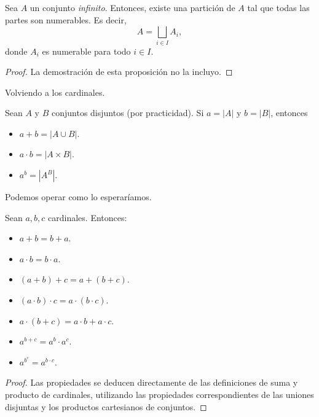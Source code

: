 \begin{proposition}
	Sea $A$ un conjunto \textit{infinito}. Entonces, existe una partición de $A$ tal que todas las partes son numerables. Es decir,
	\begin{equation*}
		A = \bigsqcup_{i \in I} A_i,
	\end{equation*}
	donde $A_i$ es numerable para todo $i \in I$.
\end{proposition}

\begin{proof}
	{\color{red} La demostración de esta proposición no la incluyo.}
\end{proof}

Volviendo a los cardinales.

\begin{definition}
	Sean $A$ y $B$ conjuntos disjuntos (por practicidad). Si $a = \lvert A \rvert$ y $b = \lvert B \rvert$, entonces
	\begin{itemize}
		\item $a + b = |A \cup B|$.
		\item $a \cdot b = |A \times B|$.
		\item $a^{b} = |A^{B}|$.
	\end{itemize}
\end{definition}

Podemos operar como lo esperaríamos.

\begin{proposition}
	Sean $a, b, c$ cardinales. Entonces:
	\begin{itemize}
		\item $a + b = b + a$.
		\item $a \cdot b = b \cdot a$.
		\item $(a + b) + c = a + (b + c)$.
		\item $(a \cdot b) \cdot c = a \cdot (b \cdot c)$.
		\item $a \cdot (b + c) = a \cdot b + a \cdot c$.
		\item $a^{b+c} = a^{b} \cdot a^{c}$.
		\item $a^{b^{c}} = a^{b \cdot c}$.
	\end{itemize}
\end{proposition}

\begin{proof}
	Las propiedades se deducen directamente de las definiciones de suma y producto de cardinales, utilizando las propiedades correspondientes de las uniones disjuntas y los productos cartesianos de conjuntos.
\end{proof}